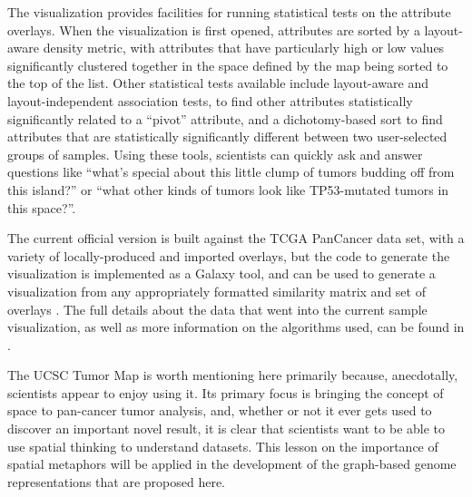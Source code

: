\documentclass[11pt,proposal]{ucthesis}
\begin{document}
The visualization provides facilities for running statistical tests on the attribute overlays. When the visualization is first opened, attributes are sorted by a layout-aware density metric, with attributes that have particularly high or low values significantly clustered together in the space defined by the map being sorted to the top of the list. Other statistical tests available include layout-aware and layout-independent association tests, to find other attributes statistically significantly related to a ``pivot'' attribute, and a dichotomy-based sort to find attributes that are statistically significantly different between two user-selected groups of samples. Using these tools, scientists can quickly ask and answer questions like ``what's special about this little clump of tumors budding off from this island?'' or ``what other kinds of tumors look like TP53-mutated tumors in this space?''.

The current official version is built against the TCGA PanCancer data set, with a variety of locally-produced and imported overlays, but the code to generate the visualization is implemented as a Galaxy tool, and can be used to generate a visualization from any appropriately formatted similarity matrix and set of overlays \cite{weinstein2013cancer,giardine2005galaxy}. The full details about the data that went into the current sample visualization, as well as more information on the algorithms used, can be found in \cite{novak2014ucsc}.

The UCSC Tumor Map is worth mentioning here primarily because, anecdotally, scientists appear to enjoy using it. Its primary focus is bringing the concept of space to pan-cancer tumor analysis, and, whether or not it ever gets used to discover an important novel result, it is clear that scientists want to be able to use spatial thinking to understand datasets. This lesson on the importance of spatial metaphors will be applied in the development of the graph-based genome representations that are proposed here.

    
    
    

    
\end{document}
